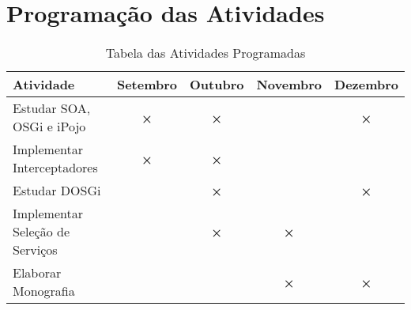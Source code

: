 \section{Programaç\~ao das Atividades}
{%
\begin{center}
\begin{table*}[h]
\begin{supertabular}[]{|l|c|c|c|c|}\hline
\textbf{Atividade} & \textbf{Setembro} & \textbf{Outubro} & \textbf{Novembro} & \textbf{Dezembro}\\\hline
Estudar SOA, OSGi e iPojo& \textbf{×} & \textbf{×} &   & \textbf{×}\\\hline
Implementar Interceptadores & \textbf{×} & \textbf{×} &  & \\\hline
Estudar DOSGi &   & \textbf{×} &   & \textbf{×}\\\hline
Implementar Seleção de Serviços &   & \textbf{×} & \textbf{×} &  \\\hline
Elaborar Monografia &   &   & \textbf{×} & \textbf{×}\\\hline
\end{supertabular}
\caption{Tabela das Atividades Programadas}
\end{table*}
\end{center}
}%


